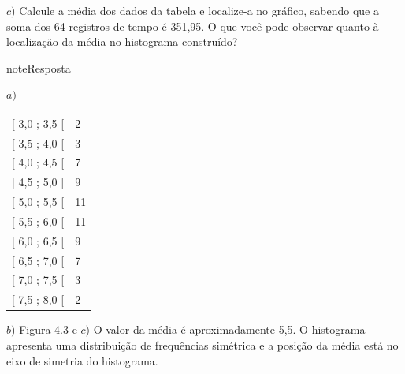 \(c)\) Calcule a média dos dados da tabela e localize-a no gráfico, sabendo que a soma dos 64 registros de tempo é 351,95. O que você pode observar quanto à localização da média no histograma construído?

\begin{sphinxadmonition}{note}{Resposta}

\(a)\)


\begin{savenotes}\sphinxattablestart
\centering
\begin{tabulary}{\linewidth}[t]{|T|T|}
\hline
{}\relax &\relax \\
\hline
{[} 3,0 ; 3,5 {[}
&
2
\\
\hline
{[} 3,5 ; 4,0 {[}
&
3
\\
\hline
{[} 4,0 ; 4,5 {[}
&
7
\\
\hline
{[} 4,5 ; 5,0 {[}
&
9
\\
\hline
{[} 5,0 ; 5,5 {[}
&
11
\\
\hline
{[} 5,5 ; 6,0 {[}
&
11
\\
\hline
{[} 6,0 ; 6,5 {[}
&
9
\\
\hline
{[} 6,5 ; 7,0 {[}
&
7
\\
\hline
{[} 7,0 ; 7,5 {[}
&
3
\\
\hline
{[} 7,5 ; 8,0 {[}
&
2
\\
\hline
\end{tabulary}
\par
\sphinxattableend\end{savenotes}

\(b)\) Figura 4.3 e \(c)\) O valor da média é aproximadamente 5,5. O histograma apresenta uma distribuição de frequências simétrica e a posição da média está no eixo de simetria do histograma.
\end{sphinxadmonition}

